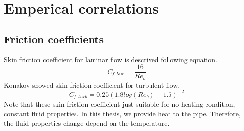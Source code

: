 \documentclass[conference]{IEEEtran}
\begin{document}
%


\section{Emperical correlations}%


\subsection{Friction coefficients}
Skin friction coefficient for laminar flow is descrived following equation.
\begin{equation}
    C_{f,lam}=\frac{16}{Re_{b}}
\end{equation}
Konakov\cite{Konakov1954} showed skin friction coefficient for turbulent flow.
\begin{equation}
    C_{f,turb}=0.25(1.8log(Re_{b})-1.5)^{-2}
\end{equation}
Note that these skin friction coefficient just suitable for no-heating condition, constant fluid properties.
In this thesis, we provide heat to the pipe.
Therefore, the fluid properties change depend on the temperature.
\end{document}
